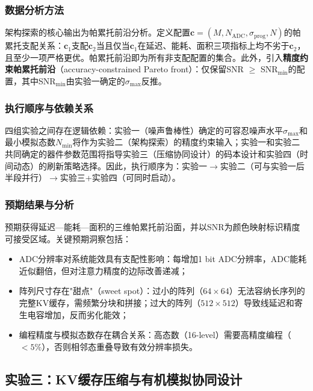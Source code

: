\subsubsection{数据分析方法}

架构探索的核心输出为帕累托前沿分析。定义配置$\mathbf{c} = (M, N_{\text{ADC}}, \sigma_{\text{prog}}, N)$的帕累托支配关系：$\mathbf{c}_1$支配$\mathbf{c}_2$当且仅当$\mathbf{c}_1$在延迟、能耗、面积三项指标上均不劣于$\mathbf{c}_2$，且至少一项严格更优。帕累托前沿即为所有非支配配置的集合。此外，引入\textbf{精度约束帕累托前沿}（accuracy-constrained Pareto front）：仅保留SNR $\geq$ SNR$_{\text{min}}$的配置，其中SNR$_{\text{min}}$由实验一确定的$\sigma_{\text{max}}$反推。

\subsubsection{执行顺序与依赖关系}

四组实验之间存在逻辑依赖：实验一（噪声鲁棒性）确定的可容忍噪声水平$\sigma_{\text{max}}$和最小模拟态数$N_{\text{min}}$将作为实验二（架构探索）的精度约束输入；实验一和实验二共同确定的器件参数范围将指导实验三（压缩协同设计）的码本设计和实验四（时间动态）的刷新策略选择。因此，执行顺序为：实验一$\rightarrow$实验二（可与实验一后半段并行）$\rightarrow$实验三+实验四（可同时启动）。

\subsubsection{预期结果与分析}

预期获得延迟—能耗—面积的三维帕累托前沿面，并以SNR为颜色映射标识精度可接受区域。关键预期洞察包括：

\begin{itemize}
    \item ADC分辨率对系统能效具有支配性影响：每增加1 bit ADC分辨率，ADC能耗近似翻倍，但对注意力精度的边际改善递减；
    \item 阵列尺寸存在"甜点"（sweet spot）：过小的阵列（$64\times64$）无法容纳长序列的完整KV缓存，需频繁分块和拼接；过大的阵列（$512\times512$）导致线延迟和寄生电容增加，反而劣化能效；
    \item 编程精度与模拟态数存在耦合关系：高态数（16-level）需要高精度编程（$<5\%$），否则相邻态重叠导致有效分辨率损失。
\end{itemize}

\subsection{实验三：KV缓存压缩与有机模拟协同设计}
\label{sec:exp3_compression}


